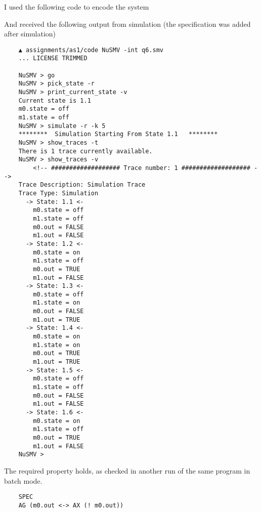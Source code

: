 \question

I used the following code to encode the system



And received the following output from simulation (the specification was added after simulation)

\begin{verbatim}
    ▲ assignments/as1/code NuSMV -int q6.smv
    ... LICENSE TRIMMED
    
    NuSMV > go
    NuSMV > pick_state -r
    NuSMV > print_current_state -v
    Current state is 1.1
    m0.state = off
    m1.state = off
    NuSMV > simulate -r -k 5
    ********  Simulation Starting From State 1.1   ********
    NuSMV > show_traces -t
    There is 1 trace currently available.
    NuSMV > show_traces -v
        <!-- ################### Trace number: 1 ################### -->
    Trace Description: Simulation Trace
    Trace Type: Simulation
      -> State: 1.1 <-
        m0.state = off
        m1.state = off
        m0.out = FALSE
        m1.out = FALSE
      -> State: 1.2 <-
        m0.state = on
        m1.state = off
        m0.out = TRUE
        m1.out = FALSE
      -> State: 1.3 <-
        m0.state = off
        m1.state = on
        m0.out = FALSE
        m1.out = TRUE
      -> State: 1.4 <-
        m0.state = on
        m1.state = on
        m0.out = TRUE
        m1.out = TRUE
      -> State: 1.5 <-
        m0.state = off
        m1.state = off
        m0.out = FALSE
        m1.out = FALSE
      -> State: 1.6 <-
        m0.state = on
        m1.state = off
        m0.out = TRUE
        m1.out = FALSE
    NuSMV >
\end{verbatim}

The required property holds, as checked in another run of the same program in
batch mode.

\begin{lstlisting}
    SPEC
    AG (m0.out <-> AX (! m0.out))
\end{lstlisting}